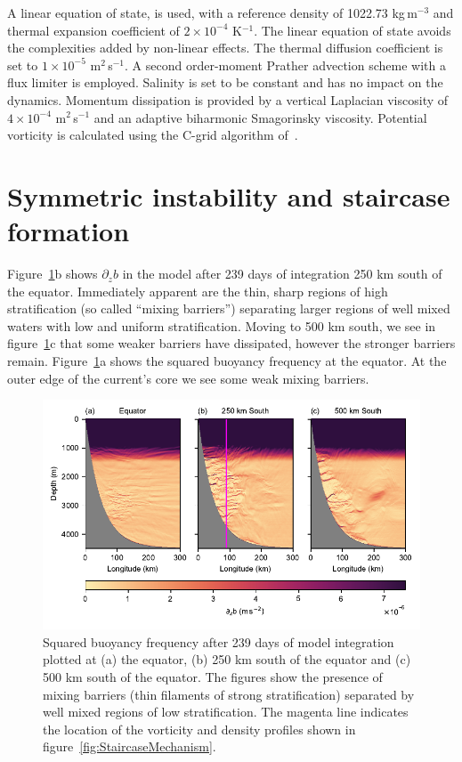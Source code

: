 A linear equation of state, is used, with a reference density of 1022.73 kg\,m$^{-3}$ and thermal expansion coefficient of $2 \times 10^{-4}$ K$^{-1}$. The linear equation of state avoids the complexities added by non-linear effects. The thermal diffusion coefficient is set to $1 \times 10^{-5}$ m$^{2}$\,s$^{-1}$. A second order-moment Prather advection scheme with a flux limiter is employed. Salinity is set to be constant and has no impact on the dynamics. Momentum dissipation is provided by a vertical Laplacian viscosity of $4 \times 10^{-4}$ m$^{2}$\,s$^{-1}$ and an adaptive biharmonic Smagorinsky viscosity. Potential vorticity is calculated using the C-grid algorithm of~\citet{Morel2019}.

\section{Symmetric instability and staircase formation}
\label{sec:randd}
Figure~\ref{fig:staircase}b shows $\partial_z b$ in the model after 239 days of integration 250 km south of the equator. Immediately apparent are the thin, sharp regions of high stratification (so called ``mixing barriers'') separating larger regions of well mixed waters with low and uniform stratification. Moving to 500 km south, we see in figure~\ref{fig:staircase}c that some weaker barriers have dissipated, however the stronger barriers remain. Figure~\ref{fig:staircase}a shows the squared buoyancy frequency at the equator. At the outer edge of the current's core we  see some weak mixing barriers.

\begin{figure}[h]
    \centering
    \includegraphics{../figures/Figure2.pdf}
    \caption{Squared buoyancy frequency after 239 days of model integration plotted at (a) the equator,  (b) 250 km south of the equator and (c) 500 km south of the equator. The figures show the presence of mixing barriers (thin filaments of strong stratification) separated by well mixed regions of low stratification. The magenta line indicates the location of the vorticity and density profiles shown in figure~\ref{fig:StaircaseMechanism}.}
    \label{fig:staircase}
\end{figure}

